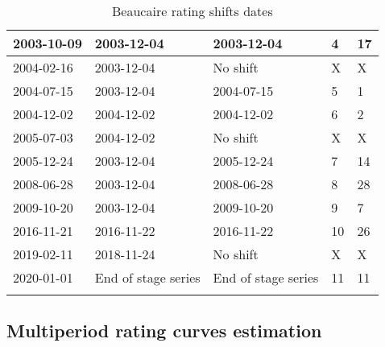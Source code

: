 \begin{center}
\begin{table}[h!]
\begin{tabular}{|m{2.5cm}|m{3.5cm}|m{3.5cm}|m{1.5cm}|m{2.2cm}|}
                \hline
                2003-10-09     &       2003-12-04  &   2003-12-04   & 4 & 17 \\
                \hline
                2004-02-16     &       2003-12-04  &   No shift   & X & X \\
                \hline
                2004-07-15     &       2003-12-04  &   2004-07-15   & 5 & 1 \\
                \hline
                2004-12-02     &       2004-12-02  &   2004-12-02   & 6 & 2 \\
                \hline
                2005-07-03     &       2004-12-02  &   No shift  & X & X \\
                \hline
                2005-12-24     &       2003-12-04  &   2005-12-24  & 7 & 14 \\
                \hline
                2008-06-28     &       2003-12-04  &   2008-06-28    & 8 & 28 \\
                \hline
                2009-10-20     &       2003-12-04  &   2009-10-20   & 9 & 7 \\
                \hline
                2016-11-21     &       2016-11-22  &   2016-11-22  & 10 & 26 \\
                \hline
                2019-02-11     &       2018-11-24  &   No shift   & X & X \\
                \hline
                2020-01-01     &      End of stage series  &   End of stage series  & 11 & 11\\
                \lasthline
            \end{tabular}
            
            \caption{Beaucaire rating shifts dates}
            \label{tab:ShiftDates}
        \end{table}
    \end{center}
     \FloatBarrier
    
    \subsection{Multiperiod rating curves estimation}

